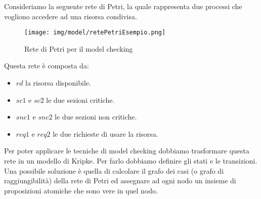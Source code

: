 \begin{esempio} %
    Consideriamo la seguente rete di Petri, la quale rappresenta due processi che
    vogliono accedere ad una risorsa condivisa.
    \begin{figure}
        \centering
        \texttt{[image: img/model/retePetriEsempio.png]}
        \caption{Rete di Petri per il model checking}
    \end{figure}
    Questa rete è composta da:
    \begin{itemize}
        \item $rd$ la risorsa disponibile.
        \item $sc1$ e $sc2$ le due sezioni critiche.
        \item $snc1$ e $snc2$ le due sezioni non critiche.
        \item $req1$ e $req2$ le due richieste di usare la risorsa.
    \end{itemize}
    Per poter applicare le tecniche di model checking dobbiamo trasformare questa
    rete in un modello di Kripke. Per farlo dobbiamo definire gli stati e le
    transizioni. Una possibile soluzione è quella di calcolare il grafo dei casi
    (o grafo di raggiungibilità) della rete di Petri ed assegnare ad ogni nodo
    un insieme di proposizioni atomiche che sono vere in quel nodo.


\end{esempio}
